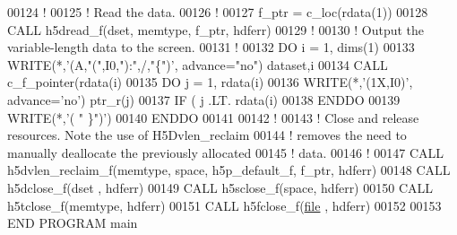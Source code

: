 \begin{DoxyCode}
00124   \textcolor{comment}{!}
00125   \textcolor{comment}{! Read the data.}
00126   \textcolor{comment}{!}
00127   f\_ptr = c\_loc(rdata(1))
00128   \textcolor{keyword}{CALL }h5dread\_f(dset, memtype, f\_ptr, hdferr)
00129   \textcolor{comment}{!}
00130   \textcolor{comment}{! Output the variable-length data to the screen.}
00131   \textcolor{comment}{!}
00132   \textcolor{keywordflow}{DO} i = 1, dims(1)
00133      \textcolor{keyword}{WRITE}(*,\textcolor{stringliteral}{'(A,"(",I0,"):",/,"\{")'}, advance=\textcolor{stringliteral}{"no"}) dataset,i
00134      \textcolor{keyword}{CALL }c\_f\_pointer(rdata(i)%
00135      \textcolor{keywordflow}{DO} j = 1, rdata(i)%
00136         \textcolor{keyword}{WRITE}(*,\textcolor{stringliteral}{'(1X,I0)'}, advance=\textcolor{stringliteral}{'no'}) ptr\_r(j)
00137         \textcolor{keywordflow}{IF} ( j .LT. rdata(i)%
00138 \textcolor{keywordflow}{     ENDDO}
00139      \textcolor{keyword}{WRITE}(*,\textcolor{stringliteral}{'( " \}")'})
00140 \textcolor{keywordflow}{  ENDDO}
00141 
00142   \textcolor{comment}{!}
00143   \textcolor{comment}{! Close and release resources.  Note the use of H5Dvlen\_reclaim}
00144   \textcolor{comment}{! removes the need to manually deallocate the previously allocated}
00145   \textcolor{comment}{! data.}
00146   \textcolor{comment}{!}
00147   \textcolor{keyword}{CALL }h5dvlen\_reclaim\_f(memtype, space, h5p\_default\_f, f\_ptr, hdferr)
00148   \textcolor{keyword}{CALL }h5dclose\_f(dset , hdferr)
00149   \textcolor{keyword}{CALL }h5sclose\_f(space, hdferr)
00150   \textcolor{keyword}{CALL }h5tclose\_f(memtype, hdferr)
00151   \textcolor{keyword}{CALL }h5fclose\_f(\hyperlink{structfile}{file} , hdferr)
00152 
00153 \textcolor{keyword}{END PROGRAM }main
\end{DoxyCode}
